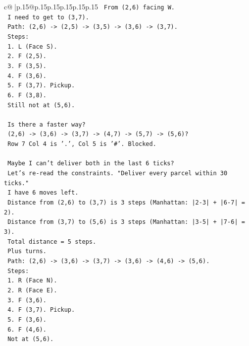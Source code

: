 \documentclass{article}
\begin{document}
{\begin{supertabular}{c@{$\;$}|p{.15\linewidth}@{}p{.15\linewidth}p{.15\linewidth}p{.15\linewidth}p{.15\linewidth}p{.15\linewidth}}
{{{\texttt{   From (2,6) facing W.} \\
\texttt{   I need to get to (3,7).} \\
\texttt{   Path: (2,6) {-}> (2,5) {-}> (3,5) {-}> (3,6) {-}> (3,7).} \\
\texttt{   Steps:} \\
\texttt{   1. L (Face S).} \\
\texttt{   2. F (2,5).} \\
\texttt{   3. F (3,5).} \\
\texttt{   4. F (3,6).} \\
\texttt{   5. F (3,7). Pickup.} \\
\texttt{   6. F (3,8).} \\
\texttt{   Still not at (5,6).} \\
\\ 
\texttt{   Is there a faster way?} \\
\texttt{   (2,6) {-}> (3,6) {-}> (3,7) {-}> (4,7) {-}> (5,7) {-}> (5,6)?} \\
\texttt{   Row 7 Col 4 is '.', Col 5 is '\#'. Blocked.} \\
\\ 
\texttt{   Maybe I can't deliver both in the last 6 ticks?} \\
\texttt{   Let's re{-}read the constraints. "Deliver every parcel within 30 ticks."} \\
\texttt{   I have 6 moves left.} \\
\texttt{   Distance from (2,6) to (3,7) is 3 steps (Manhattan: |2{-}3| + |6{-}7| = 2).} \\
\texttt{   Distance from (3,7) to (5,6) is 3 steps (Manhattan: |3{-}5| + |7{-}6| = 3).} \\
\texttt{   Total distance = 5 steps.} \\
\texttt{   Plus turns.} \\
\texttt{   Path: (2,6) {-}> (3,6) {-}> (3,7) {-}> (3,6) {-}> (4,6) {-}> (5,6).} \\
\texttt{   Steps:} \\
\texttt{   1. R (Face N).} \\
\texttt{   2. R (Face E).} \\
\texttt{   3. F (3,6).} \\
\texttt{   4. F (3,7). Pickup.} \\
\texttt{   5. F (3,6).} \\
\texttt{   6. F (4,6).} \\
\texttt{   Not at (5,6).} \\
\\ 
}}}
\end{supertabular}}
\end{document}
